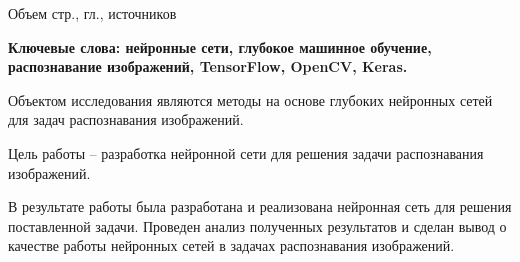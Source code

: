 
Объем \pageref{LastPage} стр., 
 гл., 
 источников

\textbf{Ключевые слова: нейронные сети, глубокое машинное обучение, распознавание изображений, TensorFlow, OpenCV, Keras.}

Объектом исследования являются методы на основе глубоких нейронных сетей для задач распознавания изображений. 

Цель работы – разработка нейронной сети для решения задачи распознавания изображений.

В результате работы была разработана и реализована нейронная сеть для решения поставленной задачи. Проведен анализ полученных результатов и сделан вывод о качестве работы нейронных сетей в задачах распознавания изображений.

\clearpage
